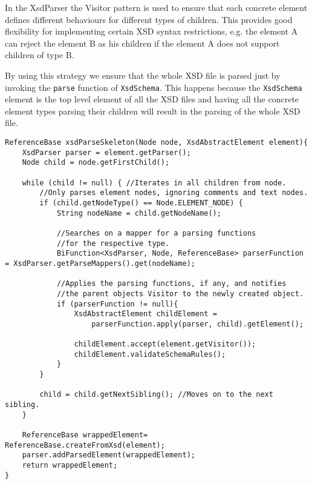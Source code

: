 \noindent
In the XsdParser the Visitor pattern is used to ensure that each concrete element defines different behaviours for different types of children. This provides good flexibility for implementing certain \ac{XSD} syntax restrictions, e.g. the element A can reject the element B as his children if the element A does not support children of type B.

\noindent
By using this strategy we ensure that the whole \ac{XSD} file is parsed just by invoking the \texttt{parse} function of \texttt{XsdSchema}. This happens because the \texttt{XsdSchema} element is the top level element of all the \ac{XSD} files and having all the concrete element types parsing their children will result in the parsing of the whole \ac{XSD} file.

\bigskip


\begin{minipage}{\linewidth}
\begin{lstlisting}[caption={XsdParseSkeleton Function - Parsing Children From a Node},captionpos=b,label={lst:skeletonfunction}]
ReferenceBase xsdParseSkeleton(Node node, XsdAbstractElement element){
    XsdParser parser = element.getParser();
    Node child = node.getFirstChild();

    while (child != null) { //Iterates in all children from node.
        //Only parses element nodes, ignoring comments and text nodes.
        if (child.getNodeType() == Node.ELEMENT_NODE) { 
            String nodeName = child.getNodeName();

            //Searches on a mapper for a parsing functions 
            //for the respective type.
            BiFunction<XsdParser, Node, ReferenceBase> parserFunction = XsdParser.getParseMappers().get(nodeName);

            //Applies the parsing functions, if any, and notifies 
            //the parent objects Visitor to the newly created object.
            if (parserFunction != null){
                XsdAbstractElement childElement =
                	parserFunction.apply(parser, child).getElement();
                
                childElement.accept(element.getVisitor());
                childElement.validateSchemaRules();
            }
        }

        child = child.getNextSibling(); //Moves on to the next sibling.
    }

    ReferenceBase wrappedElement= ReferenceBase.createFromXsd(element);
    parser.addParsedElement(wrappedElement);
    return wrappedElement;
}
\end{lstlisting}
\end{minipage}

